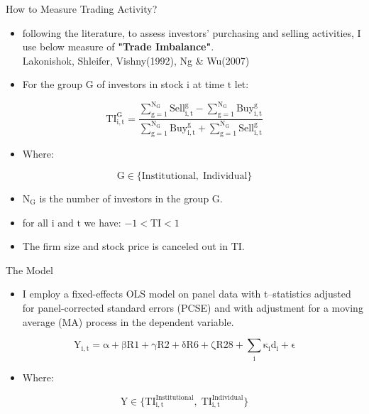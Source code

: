 \documentclass{beamer}
\begin{document}
\begin{frame}{How to Measure Trading Activity?}
    \begin{itemize}
        \item following the literature, to assess investors' purchasing and selling activities, I use below measure of \textbf{"Trade Imbalance"}.\\Lakonishok, Shleifer, Vishny(1992), Ng \& Wu(2007)
        \item For the group \(\mathrm{G}\) of investors in stock \(\mathrm{i}\) at time \(\mathrm{t}\) let:
    \end{itemize}
    \[
        \mathrm{TI_{i, t}^G=\frac{\sum_{g=1}^{N_G} Sell_{i, t}^g - \sum_{g=1}^{N_G} Buy_{i, t}^g}{\sum_{g=1}^{N_G} Buy_{i, t}^g + \sum_{g=1}^{N_G} Sell_{i, t}^g}}
    \]

    \begin{itemize}
        \item Where:
    \end{itemize}

    \[
        \mathrm{G                     \in  \{Institutional, \; Individual\}}
    \]

    \begin{itemize}
        \item \(\mathrm{N_G}\) is the number of investors in the group \(\mathrm{G}\).
        \item for all \(\mathrm{i}\) and \(\mathrm{t}\) we have: \(-1 < \mathrm{TI} < 1\)
        \item The firm size and stock price is canceled out in \(\mathrm{TI}\).
    \end{itemize}

\end{frame}

\begin{frame}
    \begin{block}{The Model}
        \begin{itemize}
            \item I employ a fixed-effects OLS model on panel data with t–statistics adjusted for panel-corrected standard errors (PCSE) and with adjustment for a moving average (MA) process in the dependent variable.
        \end{itemize}
        \[
            \mathrm{Y_{i,t} = \alpha + \beta R1 + \gamma R2 + \delta R6 + \zeta R28 + \sum_i \kappa_i d_i + \epsilon}
        \]
        \begin{itemize}
            \item Where:
        \end{itemize}
        \[
            \mathrm{Y \in \{{TI}_{i,t}^{Institutional}, \; {TI}_{i,t}^{Individual}\}}
        \]
    \end{block}
\end{frame}
\end{document}
